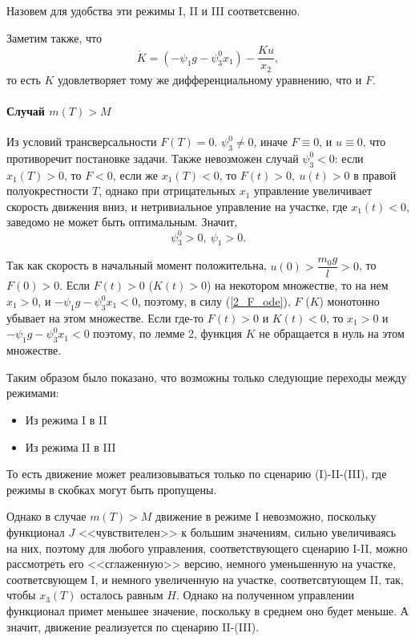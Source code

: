 \documentclass[16pt]{article}
\begin{document}
Назовем для удобства эти режимы I, II и III соответсвенно.

Заметим также, что 
$$\dot{K} = (-\psi_1g - \psi_3^0 x_1) - \dfrac{Ku}{x_2},$$
то есть $K$ удовлетворяет тому же дифференциальному уравнению, что и $F$.

\paragraph{Случай $m(T) > M$}
Из условий трансверсальности $F(T) = 0$. $\psi_3^0 \not= 0$, иначе $F \equiv 0$, и $u \equiv 0$, что противоречит
постановке задачи. Также невозможен случай $\psi_3^0 < 0$: если $x_1(T) > 0$, то $F < 0$, если же $x_1(T) < 0$, то
$F(t) > 0,\ u(t) > 0$ в правой полуокрестности $T$, однако при отрицательных $x_1$ управление увеличивает скорость
движения вниз, и нетривиальное управление на участке, где $x_1(t) < 0$, заведомо не может быть оптимальным.
Значит, $$\psi_3^0 > 0, \ \psi_1 > 0.$$

Так как скорость в начальный момент положительна, $u(0) > \dfrac{m_0g}{l} > 0$, то $F(0) > 0$.
Если $F(t) > 0$ ($K(t) > 0$) на некотором множестве, то на нем $x_1 > 0$, и $-\psi_1g-\psi_3^0x_1 < 0$,
поэтому, в силу (\ref{2_F_ode}), $F$ ($K$) монотонно убывает на этом множестве. Если где-то $F(t) > 0$ и $K(t) < 0$,
то $x_1 > 0$ и $-\psi_1g-\psi_3^0x_1 < 0$ поэтому, по лемме 2, функция $K$ не обращается в нуль на этом множестве.

Таким образом было показано, что возможны только следующие переходы между режимами: 
\begin{itemize}
\item
Из режима I в II
\item
Из режима II в III
\end{itemize}

То есть движение может реализовываться только по сценарию (I)-II-(III), где режимы в скобках могут быть пропущены.

Однако в случае $m(T) > M$ движение в режиме I невозможно, поскольку функционал $J$ <<чувствителен>>  к большим
значениям, сильно увеличиваясь на них, поэтому для любого управления, соответствующего сценарию I-II, можно
рассмотреть его <<сглаженную>> версию, немного уменьшенную на участке, соответсвующем I, и немного увеличенную на
участке, соответсвтующем II, так, чтобы $x_3(T)$ осталось равным $H$. Однако на полученном управлении функционал
примет меньшее значение, поскольку в среднем оно будет меньше. А значит, движение реализуется по сценарию II-(III).
\end{document}
